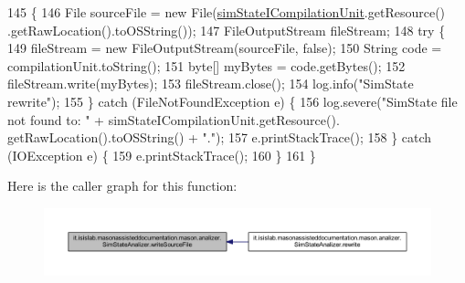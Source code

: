 \begin{DoxyCode}
145                                   \{
146         File sourceFile = \textcolor{keyword}{new} File(\hyperlink{classit_1_1isislab_1_1masonassisteddocumentation_1_1mason_1_1analizer_1_1_sim_state_analizer_a5a4cf52aff7f9d349b30f11960687b9c}{simStateICompilationUnit}.getResource()
      .getRawLocation().toOSString());
147         FileOutputStream fileStream;
148         \textcolor{keywordflow}{try} \{
149             fileStream = \textcolor{keyword}{new} FileOutputStream(sourceFile, \textcolor{keyword}{false});
150             String code = compilationUnit.toString();
151             byte[] myBytes = code.getBytes();
152             fileStream.write(myBytes);
153             fileStream.close();
154             log.info(\textcolor{stringliteral}{"SimState rewrite"});
155         \} \textcolor{keywordflow}{catch} (FileNotFoundException e) \{
156             log.severe(\textcolor{stringliteral}{"SimState file not found to: "} + simStateICompilationUnit.getResource().
      getRawLocation().toOSString() + \textcolor{stringliteral}{"."});
157             e.printStackTrace();
158         \} \textcolor{keywordflow}{catch} (IOException e) \{
159             e.printStackTrace();
160         \}
161     \}
\end{DoxyCode}


Here is the caller graph for this function\-:\nopagebreak
\begin{figure}[H]
\begin{center}
\leavevmode
\includegraphics[width=350pt]{classit_1_1isislab_1_1masonassisteddocumentation_1_1mason_1_1analizer_1_1_sim_state_analizer_a310f2f2452a5f26ea5e1f86bcbc88f56_icgraph}
\end{center}
\end{figure}




